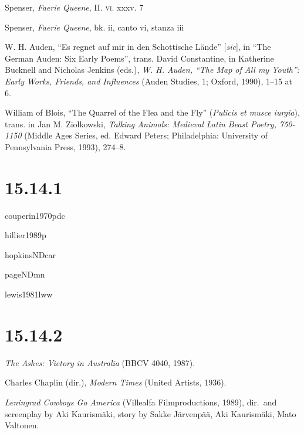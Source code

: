 \documentclass[extrafontsizes,11pt,a4paper,oneside]{memoir}
\begin{document}
Spenser, \emph{Faerie Queene}, II. \textsc{vi}. xxxv. 7

Spenser, \emph{Faerie Queene}, bk. ii, canto vi, stanza iii

W. H. Auden, \enquote{Es regnet auf mir in den Schottische Lände} [\emph{sic}], in \enquote{The German Auden: Six Early Poems}, trans. David Constantine, in Katherine Bucknell and Nicholas Jenkins (eds.), \emph{W. H. Auden, \enquote{The Map of All my Youth}: Early Works, Friends, and Influences} (Auden Studies, 1; Oxford, 1990), 1--15 at 6.

William of Blois, \enquote{The Quarrel of the Flea and the Fly} (\emph{Pulicis et musce iurgia}), trans. in Jan M. Ziolkowski, \emph{Talking Animals: Medieval Latin Beast Poetry, 750-1150} (Middle Ages Series, ed. Edward Peters; Philadelphia: University of Pennsylvania Press, 1993), 274--8.

\section*{15.14.1} %

%
{couperin1970pdc}

%
{hillier1989p}

%
{hopkinsNDcar}

{pageNDmn}

{lewis1981lww}

\section*{15.14.2} %

\emph{The Ashes: Victory in Australia} (BBCV 4040, 1987).

Charles Chaplin (dir.), \emph{Modern Times} (United Artists, 1936).

\emph{Leningrad Cowboys Go America} (Villealfa Filmproductions, 1989), dir.\ and screenplay by Aki Kaurismäki, story by Sakke Järvenpää, Aki Kaurismäki, Mato Valtonen.
\end{document}
